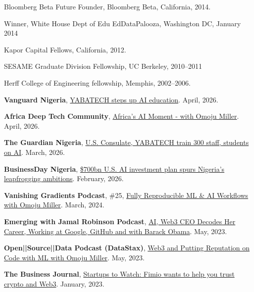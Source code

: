 \documentclass[11pt,article,oneside]{memoir}
\begin{document}
\ind Bloomberg Beta Future Founder, Bloomberg Beta, California, 2014.

\ind Winner, White House Dept of Edu EdDataPalooza, Washington DC, January 2014

\ind Kapor Capital Fellows, California, 2012.

\ind SESAME Graduate Division Fellowship, UC Berkeley, 2010--2011

\ind Herff College of Engineering fellowship, Memphis, 2002--2006.

\bigskip

\medskip

\ind \textbf{Vanguard Nigeria}, \href{https://www.vanguardngr.com/2026/04/yabatech-steps-up-ai-education/}{YABATECH steps up AI education}. April, 2026.

\ind \textbf{Africa Deep Tech Community}, \href{https://adtc.substack.com/p/africas-ai-moment-with-omoju-miller}{Africa's AI Moment - with Omoju Miller}. April, 2026.

\ind \textbf{The Guardian Nigeria}, \href{https://guardian.ng/education/u-s-consulate-yabatech-train-300-staff-students-on-ai/}{U.S. Consulate, YABATECH train 300 staff, students on AI}. March, 2026.

\ind \textbf{BusinessDay Nigeria}, \href{https://businessday.ng/technology/article/700bn-u-s-ai-investment-plan-spurs-nigerias-leapfrogging-ambitions/}{\$700bn U.S. AI investment plan spurs Nigeria's leapfrogging ambitions}. February, 2026.

\ind \textbf{Vanishing Gradients Podcast}, \#25, \href{https://vanishinggradients.fireside.fm/25}{Fully Reproducible ML \& AI Workflows with Omoju Miller}. March, 2024.

\ind \textbf{Emerging with Jamal Robinson Podcast}, \href{https://podtail.com/en/podcast/emerging-with-jamal-robinson/}{AI, Web3 CEO Decodes Her Career, Working at Google, GitHub and with Barack Obama}. May, 2023.

\ind \textbf{Open||Source||Data Podcast (DataStax)}, \href{https://www.datastax.com/resources/podcast/web3-putting-reputation-on-code-with-ml-omoju-miller}{Web3 and Putting Reputation on Code with ML with Omoju Miller}. May, 2023.

\ind \textbf{The Business Journal}, \href{https://www.bizjournals.com/sanfrancisco/inno/stories/awards/2023/01/13/startups-to-watch.html}{Startups to Watch: Fimio wants to help you trust crypto and Web3}. January, 2023.
\end{document}
